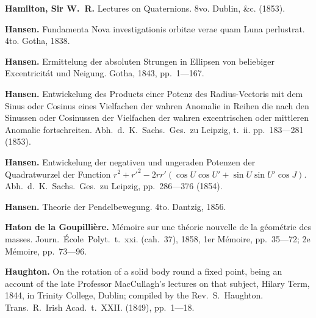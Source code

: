 \documentclass[11pt,a4paper]{book}
\begin{document}
\vspace{0.5em}

\noindent\textbf{Hamilton, Sir W.~R.} Lectures on Quaternions. 8vo. Dublin, \&c. (1853).

\vspace{0.5em}

\noindent\textbf{Hansen.} Fundamenta Nova investigationis orbitae verae quam Luna perlustrat. 4to. Gotha, 1838.

\vspace{0.5em}

\noindent\textbf{Hansen.} Ermittelung der absoluten Strungen in Ellipsen von beliebiger Excentricit\'{a}t und Neigung. Gotha, 1843, pp.~1---167.

\vspace{0.5em}

\noindent\textbf{Hansen.} Entwickelung des Products einer Potenz des Radius-Vectoris mit dem Sinus oder Cosinus eines Vielfachen der wahren Anomalie in Reihen die nach den Sinussen oder Cosinussen der Vielfachen der wahren excentrischen oder mittleren Anomalie fortschreiten. Abh.~d.~K.~Sachs.~Ges.~zu Leipzig, t.~ii. pp.~183---281 (1853).

\vspace{0.5em}

\noindent\textbf{Hansen.} Entwickelung der negativen und ungeraden Potenzen der Quadratwurzel der Function $r^2 + r'^2 - 2rr'(\cos U \cos U' + \sin U \sin U' \cos J)$. Abh.~d.~K.~Sachs.~Ges.~zu Leipzig, pp.~286---376 (1854).

\vspace{0.5em}

\noindent\textbf{Hansen.} Theorie der Pendelbewegung. 4to. Dantzig, 1856.

\vspace{0.5em}

\noindent\textbf{Haton de la Goupilli\`{e}re.} M\'{e}moire sur une th\'{e}orie nouvelle de la g\'{e}om\'{e}trie des masses. Journ.~\'{E}cole~Polyt.~t.~xxi. (cah.~37), 1858, 1er M\'{e}moire, pp.~35---72; 2e M\'{e}moire, pp.~73---96.

\vspace{0.5em}

\noindent\textbf{Haughton.} On the rotation of a solid body round a fixed point, being an account of the late Professor MacCullagh's lectures on that subject, Hilary Term, 1844, in Trinity College, Dublin; compiled by the Rev.~S.~Haughton. Trans.~R.~Irish Acad.~t.~XXII. (1849), pp.~1---18.
\end{document}
